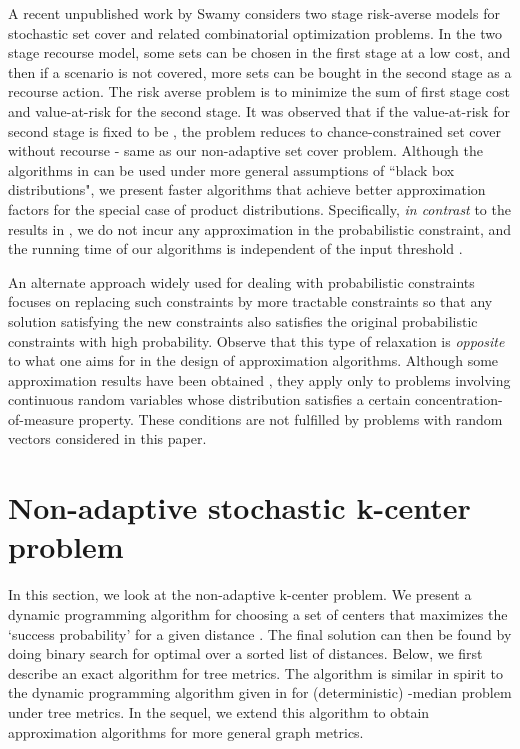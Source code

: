 \documentclass[11pt,onecolumn]{article}
\begin{document}
A recent unpublished work by Swamy \cite{swamy-risk-averse} considers two stage risk-averse models for stochastic set cover and related combinatorial optimization problems. In the two stage recourse model, some sets can be chosen in the first stage at a low cost, and then if a scenario is not covered, more sets can be bought in the second stage as a recourse action. The risk averse problem is to minimize the sum of first stage cost and value-at-risk for the second stage. It was observed that if the value-at-risk for second stage is fixed to be , the problem reduces to chance-constrained set cover without recourse - same as our non-adaptive set cover problem. Although the algorithms in \cite{swamy-risk-averse} can be used under more general assumptions of ``black box distributions", we present faster algorithms that achieve better approximation factors for the special case of product distributions. Specifically, {\it in contrast} to the results in \cite{swamy-risk-averse}, we do not incur any approximation in the probabilistic constraint, and the running time of our algorithms is independent of the input threshold .  

An alternate approach widely used for dealing with probabilistic constraints focuses on replacing such constraints by more tractable constraints \cite{calafiore-chance06, neimro-chance06, iyengar-chance07} so that any solution satisfying the new constraints also satisfies the original probabilistic constraints with high probability. Observe that this type of relaxation is {\it opposite} to what one aims for in the design of approximation algorithms. 
Although some approximation results have been obtained \cite{calafiore-chance06, neimro-chance06, iyengar-chance07}, they apply only to problems involving continuous random variables whose distribution satisfies a certain concentration-of-measure property. These conditions are not fulfilled by problems with  random vectors considered in this paper.

\section{Non-adaptive stochastic k-center problem}
In this section, we look at the non-adaptive k-center problem. We present a dynamic programming algorithm for choosing a set  of  centers that maximizes the `success probability'  for a given distance . The final solution can then be found by doing binary search for optimal  over a sorted list of  distances. 
Below, we first describe an exact algorithm for tree metrics. The algorithm is similar in spirit to the dynamic programming algorithm given in \cite{p-median} for (deterministic) -median problem under tree metrics. 
In the sequel, we extend this algorithm to obtain approximation algorithms for more general graph metrics.
\end{document}
